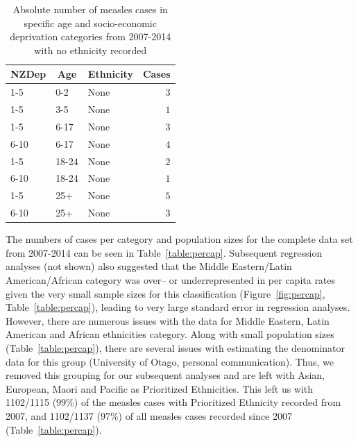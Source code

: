 \documentclass{article}
\begin{document}
\begin{itemize}
\begin{table}[hbtp]
\footnotesize
\begin{center}
\begin{tabular}{lllr}
\hline\hline
\multicolumn{1}{c}{NZDep}&\multicolumn{1}{c}{Age}&\multicolumn{1}{c}{Ethnicity}&\multicolumn{1}{c}{Cases}\tabularnewline
\hline
1-5&0-2&None&$3$\tabularnewline
1-5&3-5&None&$1$\tabularnewline
1-5&6-17&None&$3$\tabularnewline
6-10&6-17&None&$4$\tabularnewline
1-5&18-24&None&$2$\tabularnewline
6-10&18-24&None&$1$\tabularnewline
1-5&25+&None&$5$\tabularnewline
6-10&25+&None&$3$\tabularnewline
\hline
\end{tabular}\end{center}\caption{Absolute number of measles cases in specific age and socio-economic deprivation categories from 2007-2014 with no ethnicity recorded}
\label{table:none}
\end{table}


The numbers of cases per category and population sizes for the complete data set from 2007-2014 can be seen in Table~\ref{table:percap}. Subsequent regression analyses (not shown) also suggested that the Middle Eastern/Latin American/African category was over-- or underrepresented in per capita rates given the very small sample sizes for this classification (Figure~\ref{fig:percap}, Table~\ref{table:percap}), leading to very large standard error in regression analyses. However, there are numerous issues with the data for Middle Eastern, Latin American and African ethnicities category. Along with small population sizes (Table~\ref{table:percap}), there are several issues with estimating the denominator data for this group (University of Otago, personal communication). Thus, we removed this grouping for our subsequent analyses and are left with Asian, European, Maori and Pacific as Prioritized Ethnicities. This left us with 1102/1115 (99\%) of the measles cases with Prioritized Ethnicity recorded from 2007, and 1102/1137 (97\%) of all measles cases recorded since 2007 (Table~\ref{table:percap}).


\end{itemize}
\end{document}
